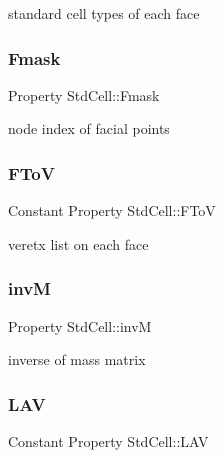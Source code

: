 standard cell types of each face 

\mbox{\label{class_std_cell_aed7a2e88c548b37a49916bd994e603fe}} 
\subsubsection{\texorpdfstring{Fmask}{Fmask}}
{\footnotesize\ttfamily Property Std\+Cell\+::\+Fmask\hspace{0.3cm}{\ttfamily [protected]}}



node index of facial points 

\mbox{\label{class_std_cell_a53b999c063d4d2c88b3910990ef3a648}} 
\subsubsection{\texorpdfstring{F\+ToV}{FToV}}
{\footnotesize\ttfamily Constant Property Std\+Cell\+::\+F\+ToV}



veretx list on each face 

\mbox{\label{class_std_cell_aa71e49dcf0945c930aafefe1c9998d56}} 
\subsubsection{\texorpdfstring{invM}{invM}}
{\footnotesize\ttfamily Property Std\+Cell\+::invM\hspace{0.3cm}{\ttfamily [protected]}}



inverse of mass matrix 

\mbox{\label{class_std_cell_ac65d1d344b5178efb58c7133cf939b7f}} 
\subsubsection{\texorpdfstring{L\+AV}{LAV}}
{\footnotesize\ttfamily Constant Property Std\+Cell\+::\+L\+AV}



